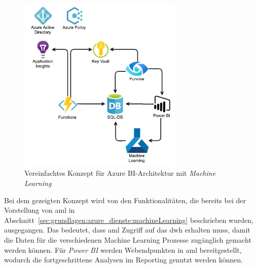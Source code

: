 \begin{figure}[htbp]
 \centering
 \includegraphics[width=0.7\textwidth]{gfx/aml.pdf}
 \caption[Vereinfachtes Konzept für Azure BI-Architektur mit Machine Learning]{Vereinfachtes Konzept für Azure BI-Architektur mit \textit{Machine Learning}}
\label{fig:praktischeUmsetzung:ausblick:aml}
\end{figure}

Bei dem gezeigten Konzept wird von den Funktionalitäten, die bereits bei der Vorstellung von \ac{aml} in Abschnitt~\ref{sec:grundlagen:azure_dienste:machineLearning} beschrieben wurden, ausgegangen. Das bedeutet, dass \ac{aml} Zugriff auf das \ac{dwh} erhalten muss, damit die Daten für die verschiedenen Machine Learning Prozesse zugänglich gemacht werden können. Für \textit{Power BI} werden Webendpunkten in \ac{aml} bereitgestellt, wodurch die fortgeschrittene Analysen im Reporting genutzt werden können. \cite[vgl.][]{soh_data_2020}